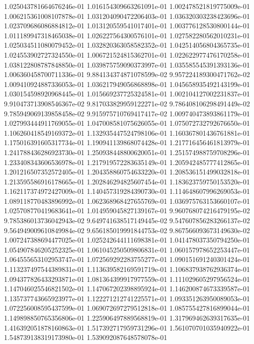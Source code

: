 1.025043781664676246e-01
1.016154309663261091e-01
1.002478521819775009e-01
1.006215361008107878e-01
1.031204090472206403e-01
1.036320303238423696e-01
1.023709686086884812e-01
1.013120559541017401e-01
1.003776128530800144e-01
1.011189947318465038e-01
1.026227564300576101e-01
1.027582280562010231e-01
1.025034511080079452e-01
1.032820363058582352e-01
1.042514056804365735e-01
1.024553902727324550e-01
1.006721524815362701e-01
1.022622977476170258e-01
1.038122808787848850e-01
1.039875759090373997e-01
1.035585545391393136e-01
1.006360458700711336e-01
9.884134374871078599e-02
9.957224189300471762e-02
1.009410924887336053e-01
1.036217949056868898e-01
1.045658935492143199e-01
1.030154598920968445e-01
1.015669237725324581e-01
1.002104127002231837e-01
9.910473713908546367e-02
9.817033829959122271e-02
9.786408106298491449e-02
9.785949069139858458e-02
9.915975710769417417e-02
1.009740473893861179e-01
1.027993444911769055e-01
1.047008581075626055e-01
1.075072732792676650e-01
1.106260418549169372e-01
1.132935447524798106e-01
1.160367801436761881e-01
1.175016391605317734e-01
1.190941139868074428e-01
1.217716456461813979e-01
1.241788436286923730e-01
1.250938448800620051e-01
1.251574988759708296e-01
1.233408343606536978e-01
1.217919572283635149e-01
1.205942485777412865e-01
1.201216507352572405e-01
1.204358860754633220e-01
1.208536151499032818e-01
1.213595586916178665e-01
1.202846294825607454e-01
1.183623759750153520e-01
1.162117374972427009e-01
1.140457319284390730e-01
1.114648607996269053e-01
1.089118770483896992e-01
1.062368968427655769e-01
1.036975763153660107e-01
1.025708770419683641e-01
1.014959045827139167e-01
9.960768074216479195e-02
9.785386013736042943e-02
9.649741638517149445e-02
9.547607856283266137e-02
9.564949009610849984e-02
9.656185019991844753e-02
9.867566093673149630e-02
1.007247388694477025e-01
1.025242644111698381e-01
1.041478037350794250e-01
1.054907846205252325e-01
1.061045250509806831e-01
1.060157978652253447e-01
1.064555653102953747e-01
1.072569292283755277e-01
1.090151691240301424e-01
1.113237497544389831e-01
1.113639582169591719e-01
1.106837938762936374e-01
1.094377826433293871e-01
1.081364399917977559e-01
1.111029605297956524e-01
1.147046025546821502e-01
1.147067202398895924e-01
1.146200874673339587e-01
1.135737743665923977e-01
1.122271212741225571e-01
1.093351263950089053e-01
1.072256008595437599e-01
1.069072697279512818e-01
1.085755427816899044e-01
1.149898850765356806e-01
1.225906497889568819e-01
1.317969462639317635e-01
1.416392051878160863e-01
1.517392717959731296e-01
1.561070701035940922e-01
1.548739138319173980e-01
1.539092087648578078e-01

